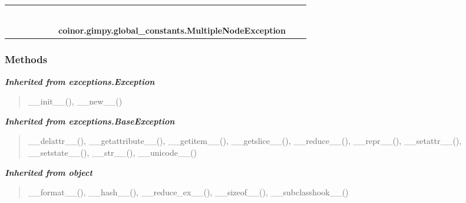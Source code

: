     \label{coinor:gimpy:global_constants:MultipleNodeException}
\begin{tabular}{cccccccccc}
\multicolumn{2}{r}{\settowidth{\BCL}{object}\multirow{2}{\BCL}{object}}
&&
&&
&&
  \\\cline{3-3}
  &&\multicolumn{1}{c|}{}
&&
&&
&&
  \\
\multicolumn{4}{r}{\settowidth{\BCL}{exceptions.BaseException}\multirow{2}{\BCL}{exceptions.BaseException}}
&&
&&
  \\\cline{5-5}
  &&&&\multicolumn{1}{c|}{}
&&
&&
  \\
\multicolumn{6}{r}{\settowidth{\BCL}{exceptions.Exception}\multirow{2}{\BCL}{exceptions.Exception}}
&&
  \\\cline{7-7}
  &&&&&&\multicolumn{1}{c|}{}
&&
  \\
&&&&&&\multicolumn{2}{l}{\textbf{coinor.gimpy.global\_constants.MultipleNodeException}}
\end{tabular}



  \subsubsection{Methods}


\large{\textbf{\textit{Inherited from exceptions.Exception}}}

\begin{quote}
\_\_init\_\_(), \_\_new\_\_()
\end{quote}

\large{\textbf{\textit{Inherited from exceptions.BaseException}}}

\begin{quote}
\_\_delattr\_\_(), \_\_getattribute\_\_(), \_\_getitem\_\_(), \_\_getslice\_\_(), \_\_reduce\_\_(), \_\_repr\_\_(), \_\_setattr\_\_(), \_\_setstate\_\_(), \_\_str\_\_(), \_\_unicode\_\_()
\end{quote}

\large{\textbf{\textit{Inherited from object}}}

\begin{quote}
\_\_format\_\_(), \_\_hash\_\_(), \_\_reduce\_ex\_\_(), \_\_sizeof\_\_(), \_\_subclasshook\_\_()
\end{quote}

